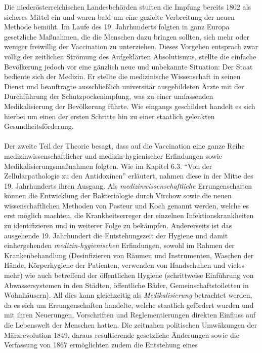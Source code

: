 \documentclass[
    a4paper,
    12pt,
    hyphens,
    chapterprefix=true,
    headheight=33pt,
    footheight=29pt,
    headings=optiontohead, %
]{scrartcl}
\begin{document}
{Die niederösterreichischen Landesbehörden stuften die Impfung bereits 1802 als sicheres Mittel ein und waren bald um eine gezielte Verbreitung der neuen Methode bemüht. Im Laufe des 19. Jahrhunderts folgten in ganz Europa gesetzliche Maßnahmen, die die Menschen dazu bringen sollten,
sich mehr oder weniger freiwillig der Vaccination zu unterziehen. Dieses
Vorgehen entsprach zwar völlig der zeitlichen Strömung des Aufgeklärten
Absolutismus, stellte die einfache Bevölkerung jedoch vor eine gänzlich neue
und unbekannte Situation: Der Staat bediente sich der Medizin. Er stellte die medizinische
Wissenschaft in seinen Dienst und beauftragte ausschließlich universitär ausgebildeten Ärzte mit der
Durchführung der Schutzpockenimpfung, was zu einer umfassenden Medikalisierung der Bevölkerung
führte. Wie eingangs geschildert handelt es sich hierbei um einen der ersten Schritte hin zu einer
staatlich gelenkten Gesundheitsförderung.\\
\\
Der zweite Teil der Theorie besagt, dass auf die Vaccination eine ganze Reihe medizinwissenschaftlicher und medizin-hygienischer Erfindungen sowie Medikalisierungsmaßnahmen folgten. Wie im Kapitel 6.3. "`Von der Zellularpathologie zu den Antidoxinen"' erläutert, nahmen diese in der Mitte des 19. Jahrhunderts ihren Ausgang. Als \textit{medizinwissenschaftliche} Errungenschaften können die Entwicklung der Bakteriologie durch Virchow sowie die neuen wissenschaftlichen Methoden von Pasteur und Koch genannt werden, welche es erst möglich machten, die Krankheitserreger der einzelnen Infektionskrankheiten zu identifizieren und in weiterer Folge zu bekämpfen. Andererseits ist das ausgehende 19. Jahrhundert die Entstehungszeit der Hygiene und damit einhergehenden \textit{medizin-hygienischen} Erfindungen, sowohl im Rahmen der Krankenbehandlung (Desinfizieren von Räumen und Instrumenten, Waschen der Hände, Körperhygiene
der Patienten, verwenden von Handschuhen und vieles mehr) wie auch betreffend der öffentlichen Hygiene (schrittweise Einführung von Abwassersystemen in den Städten, öffentliche Bäder,
Gemeinschaftstoiletten in Wohnhäusern). All dies kann gleichzeitig als \textit{Medikalisierung} betrachtet werden, da es sich um Errungenschaften handelte, welche staatlich gefördert wurden und mit ihren Neuerungen, Vorschriften und Reglementierungen direkten Einfluss auf die Lebenswelt der Menschen hatten. Die zeitnahen politischen Umwälzungen der Märzrevolution 1849, daraus resultierende gesetzliche Änderungen sowie die Verfassung von 1867 ermöglichten zudem die Entstehung eines
}
\end{document}
